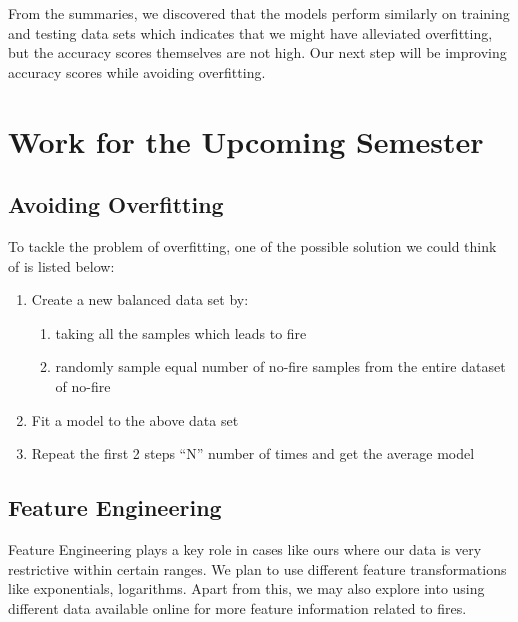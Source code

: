 \documentclass[10pt]{article}
\begin{document}



From the summaries, we discovered that the models perform similarly on training
and testing data sets which indicates that we might have alleviated
overfitting, but the accuracy scores themselves are not high. Our next step
will be improving accuracy scores while avoiding overfitting.\par

\section{Work for the Upcoming Semester}
\subsection{Avoiding Overfitting}
To tackle the problem of overfitting, one of the possible solution we
could think of is listed below:
\begin{enumerate}
    \item
    Create a new balanced data set by:
    \begin{enumerate}
        \item
        taking all the samples which leads to fire
        \item
        randomly sample equal number of no-fire samples from the entire
        dataset of no-fire
    \end{enumerate}
    \item
    Fit a model to the above data set
    \item
    Repeat the first 2 steps ``N'' number of times and get the average model
\end{enumerate}
\subsection{Feature Engineering}
Feature Engineering plays a key role in cases like ours where our data is very
restrictive within certain ranges. We plan to use different feature
transformations like exponentials, logarithms. Apart from this, we may also
explore into using different data available online for more feature information
related to fires.\par
\end{document}
